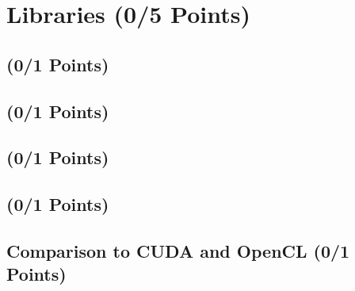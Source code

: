 \section{Libraries (0/5 Points)}
\subsection{ (0/1 Points)}

\subsection{ (0/1 Points)}

\subsection{ (0/1 Points)}

\subsection{ (0/1 Points)}

\subsection{Comparison to CUDA and OpenCL (0/1 Points)}


\pagebreak